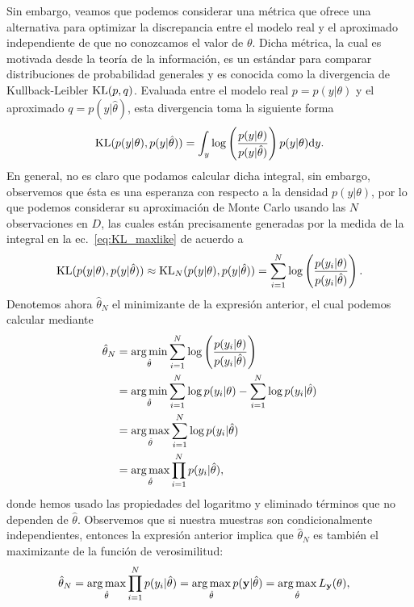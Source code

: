 Sin embargo, veamos que podemos considerar una métrica que ofrece una alternativa para optimizar la discrepancia entre el modelo real y el aproximado independiente de que no conozcamos el valor de $\theta$. Dicha métrica, la cual es motivada desde la teoría de la información, es un estándar para comparar distribuciones de probabilidad generales y es conocida como la divergencia de Kullback-Leibler $\operatorname{\text{KL}}(p,q) $. Evaluada entre el modelo real $p =  p(y|\theta)$ y el aproximado $q  = p(y|\hat\theta)$, esta divergencia toma la siguiente forma 
\begin{equation}
 	\operatorname{\text{KL}}( p(y|\theta),p(y|\hat\theta)) =  \int_y\log\left(\frac{p(y|\theta)}{p(y|\hat\theta)}\right)p(y|\theta){\text d} y.\label{eq:KL_maxlike}
 \end{equation} 
 En general, no es claro que podamos calcular dicha integral, sin embargo, observemos que ésta es una  esperanza con respecto a la densidad $p(y|\theta)$, por lo que podemos considerar su aproximación de Monte Carlo usando las $N$ observaciones en $D$, las cuales están precisamente generadas por la medida de la integral en la ec.~\eqref{eq:KL_maxlike} de acuerdo a 
\begin{equation}
	\operatorname{\text{KL}}( p(y|\theta),p(y|\hat\theta)) 	\approx \operatorname{\text{KL}}_N( p(y|\theta),p(y|\hat\theta)) = \sum_{i=1}^N\log\left(\frac{p(y_i|\theta)}{p(y_i|\hat\theta)}\right).
\end{equation}
 Denotemos ahora $\hat\theta_N$ el minimizante de la  expresión anterior, el cual podemos calcular mediante\begin{align}
 	\hat\theta_N & =  \operatorname*{arg\,min}_{\hat\theta}  \sum_{i=1}^N\log\left(\frac{p(y_i|\theta)}{p(y_i|\hat\theta)}\right)\\
 				&= \operatorname*{arg\,min}_{\hat\theta}  \sum_{i=1}^N  \log p(y_i|\theta) - \sum_{i=1}^N \log p(y_i|\hat\theta)\nonumber\\
 				&= \operatorname*{arg\,max}_{\hat\theta}  \sum_{i=1}^N \log p(y_i|\hat\theta)\nonumber\\
 				&= \operatorname*{arg\,max}_{\hat\theta}  \prod_{i=1}^N p(y_i|\hat\theta),\nonumber
 \end{align}
 donde hemos usado las propiedades del logaritmo y eliminado términos que no dependen de $\hat\theta$. Observemos que si nuestra muestras son condicionalmente independientes, entonces la expresión anterior implica que $\hat\theta_N$ es también el maximizante de la función de verosimilitud:
 \begin{align}
 	\hat\theta_N &= \operatorname*{arg\,max}_{\hat\theta}  \prod_{i=1}^N p(y_i|\hat\theta) = \operatorname*{arg\,max}_{\hat\theta}  p(\mathbf{y}|\hat\theta) = \operatorname*{arg\,max}_{\hat\theta}  L_{\mathbf{y}}(\theta),
 \end{align}
